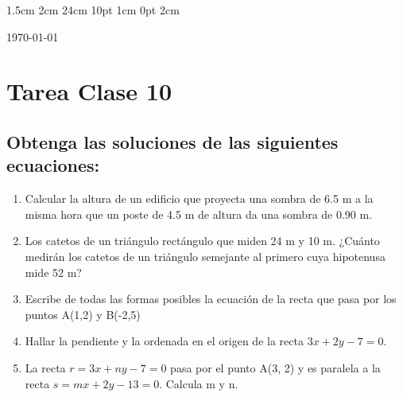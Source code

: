 \documentclass[12pt,letterpaper]{report}
\begin{document}
\setmargins{2.5cm}      
{1.5cm}                     
{2cm}  
{24cm}                    
{10pt}                          
{1cm}                          
{0pt}                             
{2cm}
\begin{flushright}
\today
\end{flushright}
\vspace{-1.75cm}
\section*{Tarea Clase 10}
\subsection*{Obtenga las soluciones de las siguientes ecuaciones:}
\begin{enumerate}
\item Calcular la altura de un edificio que proyecta una sombra de 6.5 m a la misma hora que un poste de 4.5 m de altura da una sombra de 0.90 m.
\item Los catetos de un triángulo rectángulo que miden 24 m y 10 m. ¿Cuánto medirán los catetos de un triángulo semejante al primero cuya hipotenusa mide 52 m?
\item Escribe de todas las formas posibles la ecuación de la recta que pasa por los puntos A(1,2) y B(-2,5)
\item Hallar la pendiente y la ordenada en el origen de la recta $3x+2y-7=0$.
\item La recta $r=3x+ny-7=0$ pasa por el punto A(3, 2) y es paralela a la recta $s=mx+2y-13=0$. Calcula m y n.
\end{enumerate}
\end{document}
